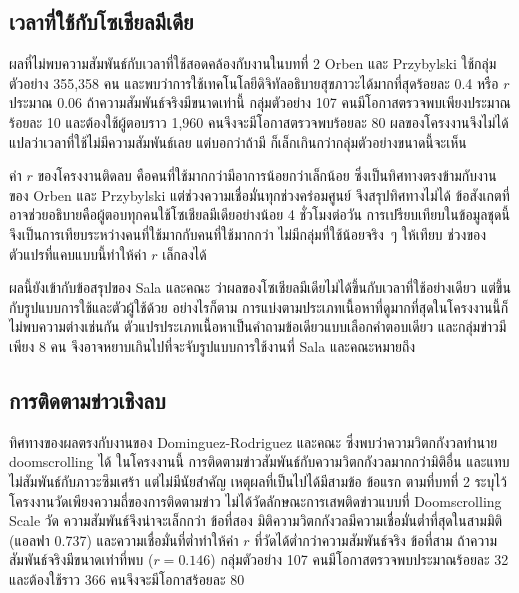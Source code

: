 \subsection{เวลาที่ใช้กับโซเชียลมีเดีย}

ผลที่ไม่พบความสัมพันธ์กับเวลาที่ใช้สอดคล้องกับงานในบทที่ 2
Orben และ Przybylski \cite{orben2019association} ใช้กลุ่มตัวอย่าง 355,358 คน
และพบว่าการใช้เทคโนโลยีดิจิทัลอธิบายสุขภาวะได้มากที่สุดร้อยละ 0.4 หรือ $r$ ประมาณ 0.06
ถ้าความสัมพันธ์จริงมีขนาดเท่านี้ กลุ่มตัวอย่าง 107 คนมีโอกาสตรวจพบเพียงประมาณร้อยละ 10
และต้องใช้ผู้ตอบราว 1,960 คนจึงจะมีโอกาสตรวจพบร้อยละ 80
ผลของโครงงานจึงไม่ได้แปลว่าเวลาที่ใช้ไม่มีความสัมพันธ์เลย
แต่บอกว่าถ้ามี ก็เล็กเกินกว่ากลุ่มตัวอย่างขนาดนี้จะเห็น

ค่า $r$ ของโครงงานติดลบ คือคนที่ใช้มากกว่ามีอาการน้อยกว่าเล็กน้อย
ซึ่งเป็นทิศทางตรงข้ามกับงานของ Orben และ Przybylski
แต่ช่วงความเชื่อมั่นทุกช่วงคร่อมศูนย์ จึงสรุปทิศทางไม่ได้
ข้อสังเกตที่อาจช่วยอธิบายคือผู้ตอบทุกคนใช้โซเชียลมีเดียอย่างน้อย 4 ชั่วโมงต่อวัน
การเปรียบเทียบในข้อมูลชุดนี้จึงเป็นการเทียบระหว่างคนที่ใช้มากกับคนที่ใช้มากกว่า
ไม่มีกลุ่มที่ใช้น้อยจริง~ๆ ให้เทียบ ช่วงของตัวแปรที่แคบแบบนี้ทำให้ค่า $r$ เล็กลงได้

ผลนี้ยังเข้ากับข้อสรุปของ Sala และคณะ \cite{sala2024umbrella}
ว่าผลของโซเชียลมีเดียไม่ได้ขึ้นกับเวลาที่ใช้อย่างเดียว แต่ขึ้นกับรูปแบบการใช้และตัวผู้ใช้ด้วย
อย่างไรก็ตาม การแบ่งตามประเภทเนื้อหาที่ดูมากที่สุดในโครงงานนี้ก็ไม่พบความต่างเช่นกัน
ตัวแปรประเภทเนื้อหาเป็นคำถามข้อเดียวแบบเลือกคำตอบเดียว และกลุ่มข่าวมีเพียง 8 คน
จึงอาจหยาบเกินไปที่จะจับรูปแบบการใช้งานที่ Sala และคณะหมายถึง

\subsection{การติดตามข่าวเชิงลบ}

ทิศทางของผลตรงกับงานของ Dominguez-Rodriguez และคณะ \cite{dominguez2025climate}
ซึ่งพบว่าความวิตกกังวลทำนาย doomscrolling ได้
ในโครงงานนี้ การติดตามข่าวสัมพันธ์กับความวิตกกังวลมากกว่ามิติอื่น
และแทบไม่สัมพันธ์กับภาวะซึมเศร้า แต่ไม่มีนัยสำคัญ
เหตุผลที่เป็นไปได้มีสามข้อ ข้อแรก ตามที่บทที่ 2 ระบุไว้ โครงงานวัดเพียงความถี่ของการติดตามข่าว
ไม่ได้วัดลักษณะการเสพติดข่าวแบบที่ Doomscrolling Scale วัด ความสัมพันธ์จึงน่าจะเล็กกว่า
ข้อที่สอง มิติความวิตกกังวลมีความเชื่อมั่นต่ำที่สุดในสามมิติ (แอลฟา 0.737)
และความเชื่อมั่นที่ต่ำทำให้ค่า $r$ ที่วัดได้ต่ำกว่าความสัมพันธ์จริง
ข้อที่สาม ถ้าความสัมพันธ์จริงมีขนาดเท่าที่พบ ($r = 0.146$) กลุ่มตัวอย่าง 107 คนมีโอกาสตรวจพบประมาณร้อยละ 32
และต้องใช้ราว 366 คนจึงจะมีโอกาสร้อยละ 80

